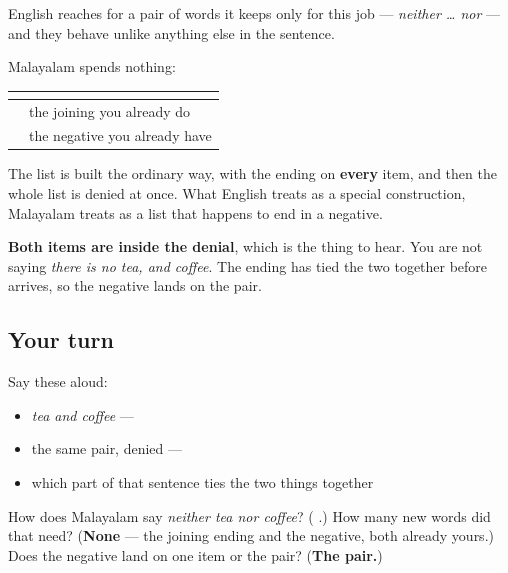 \begin{grammarlens}[title={Grammar Lens: English buys a special word for this and Malayalam does not}]
English reaches for a pair of words it keeps only for this job — \emph{neither … nor} — and they behave unlike anything else in the sentence.

Malayalam spends nothing:

\noindent
\begin{tabularx}{\linewidth}{@{}>{\raggedright\arraybackslash}X>{\raggedright\arraybackslash}X@{}}
\toprule
\textbf{} & \textbf{} \\
\midrule
\textbf{\ml{ചായയും} \ml{കാപ്പിയും}} & the joining you already do \\
\textbf{\ml{ഇല്ല}} & the negative you already have \\
\bottomrule
\end{tabularx}

The list is built the ordinary way, with the ending on \textbf{every} item, and then the whole list is denied at once. What English treats as a special construction, Malayalam treats as a list that happens to end in a negative.

\textbf{Both items are inside the denial}, which is the thing to hear. You are not saying \emph{there is no tea, and coffee}. The ending has tied the two together before \textbf{} arrives, so the negative lands on the pair.
\end{grammarlens}

\subsection*{Your turn}
Say these aloud:

\begin{itemize}
\raggedright
  \item \emph{tea and coffee} — \textbf{ }
  \item the same pair, denied — \textbf{  }
  \item which part of that sentence ties the two things together
\end{itemize}

\begin{tcolorbox}[breakable,colback=teal!4,colframe=teal!35!black,title={Before you move on}]
How does Malayalam say \emph{neither tea nor coffee}? (\textbf{  }.) How many new words did that need? (\textbf{None} — the joining ending and the negative, both already yours.) Does the negative land on one item or the pair? (\textbf{The pair.})
\end{tcolorbox}
